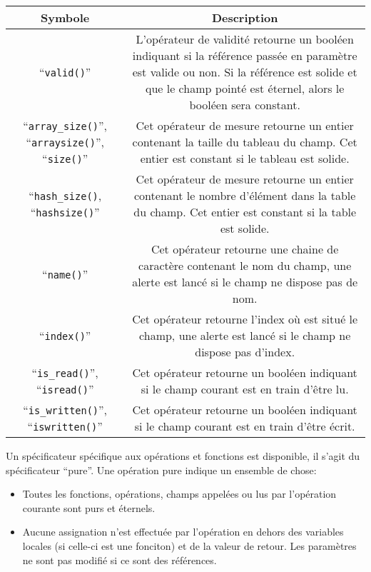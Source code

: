 \documentclass[a5paper, 12pt]{book}
\begin{document}
\begin{tabular}{c|c}
  \hline
  Symbole & Description\\
  \hline
  ``\verb!valid()!'' & L'opérateur de validité retourne un booléen indiquant si la référence
  passée en paramètre est valide ou non. Si la référence est solide et que le champ
  pointé est éternel, alors le booléen sera constant.\\
  ``\verb!array_size()!'', ``\verb!arraysize()!'', ``\verb!size()!'' & Cet opérateur de mesure retourne un entier
  contenant la taille du tableau du champ. Cet entier est constant si le tableau est solide.\\
  ``\verb!hash_size()!, ``\verb!hashsize()!'' & Cet opérateur de mesure retourne un entier contenant
  le nombre d'élément dans la table du champ. Cet entier est constant si la table est solide.\\
  ``\verb!name()!'' & Cet opérateur retourne une chaine de caractère contenant le nom du champ,
  une alerte est lancé si le champ ne dispose pas de nom.\\
  ``\verb!index()!'' & Cet opérateur retourne l'index où est situé le champ,
  une alerte est lancé si le champ ne dispose pas d'index.\\
  ``\verb!is_read()!'', ``\verb!isread()!'' & Cet opérateur retourne un booléen indiquant si le champ courant est
  en train d'être lu.\\
  ``\verb!is_written()!'', ``\verb!iswritten()!'' & Cet opérateur retourne un booléen indiquant si le champ courant
  est en train d'être écrit.\\
  \hline
\end{tabular}


Un spécificateur spécifique aux opérations et fonctions est disponible,
il s'agit du spécificateur ``pure''. Une opération pure indique un
ensemble de chose:

\begin{itemize}
  \item Toutes les fonctions, opérations, champs appelées ou lus par
    l'opération courante sont purs et éternels.
  \item Aucune assignation n'est effectuée par l'opération en dehors
    des variables locales (si celle-ci est une fonciton) et de la
    valeur de retour. Les paramètres ne sont pas modifié si ce sont
    des références.
\end{itemize}
\end{document}
